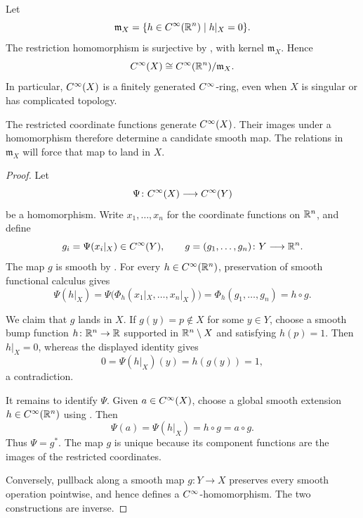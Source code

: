 Let
\[
  \mathfrak m_X
  =\{h\in C^\infty(\mathbb{R}^n)\mid h|_X=0\}.
\]
The restriction homomorphism is surjective by
, with kernel $\mathfrak m_X$.
Hence
\[
  C^\infty(X)\cong C^\infty(\mathbb{R}^n)/\mathfrak m_X.
\]
In particular, $C^\infty(X)$ is a finitely generated $C^\infty$-ring, even when
$X$ is singular or has complicated topology.

The restricted coordinate functions generate $C^\infty(X)$. Their images
under a homomorphism therefore determine a candidate smooth map. The
relations in $\mathfrak m_X$ will force that map to land in $X$.


\begin{proof}
  Let
  \[
    \Psi\colon C^\infty(X)\longrightarrow C^\infty(Y)
  \]
  be a homomorphism. Write $x_1,\ldots,x_n$ for the coordinate functions on
  $\mathbb{R}^n$, and define
  \[
    g_i=\Psi(x_i|_X)\in C^\infty(Y),
    \qquad
    g=(g_1,\ldots,g_n)\colon Y\longrightarrow\mathbb{R}^n.
  \]
  The map $g$ is smooth by . For every
  $h\in C^\infty(\mathbb{R}^n)$, preservation of smooth functional calculus gives
  \[
    \Psi(h|_X)
    =\Psi\bigl(\Phi_h(x_1|_X,\ldots,x_n|_X)\bigr)
    =\Phi_h(g_1,\ldots,g_n)
    =h\circ g.
  \]

  We claim that $g$ lands in $X$. If $g(y)=p\notin X$ for some $y\in Y$,
  choose a smooth bump function $h\colon\mathbb{R}^n\to\mathbb{R}$ supported in
  $\mathbb{R}^n\setminus X$ and satisfying $h(p)=1$. Then $h|_X=0$, whereas the
  displayed identity gives
  \[
    0=\Psi(h|_X)(y)=h(g(y))=1,
  \]
  a contradiction.

  It remains to identify $\Psi$. Given $a\in C^\infty(X)$, choose a global
  smooth extension $h\in C^\infty(\mathbb{R}^n)$ using
  . Then
  \[
    \Psi(a)=\Psi(h|_X)=h\circ g=a\circ g.
  \]
  Thus $\Psi=g^*$. The map $g$ is unique because its component functions are
  the images of the restricted coordinates.

  Conversely, pullback along a smooth map $g\colon Y\to X$ preserves every
  smooth operation pointwise, and hence defines a $C^\infty$-homomorphism. The
  two constructions are inverse.
\end{proof}

